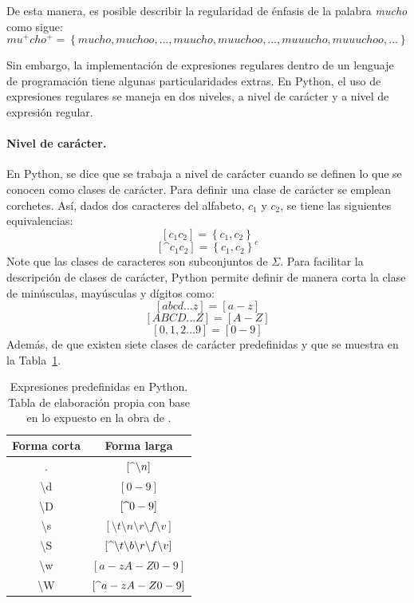 De esta manera, es posible describir la regularidad de énfasis de la palabra \textit{mucho} como sigue:
$$mu^+cho^+ = \left\lbrace mucho, muchoo, \ldots, muucho, muuchoo, \ldots, muuucho, muuuchoo, \ldots \right \rbrace$$

Sin embargo, la implementación de expresiones regulares dentro de un lenguaje de programación tiene algunas particularidades extras. En Python, el uso de expresiones regulares se maneja en dos niveles, a nivel de carácter y a nivel de expresión regular.

\paragraph{Nivel de carácter.} En Python, se dice que se trabaja a nivel de carácter cuando se definen lo que se conocen como clases de carácter. Para definir una clase de carácter se emplean corchetes. Así, dados dos caracteres del alfabeto, $c_1$ y $c_2$, se tiene las siguientes equivalencias:
$$[c_1c_2] = \left\lbrace c_1, c_2 \right\rbrace$$
$$[\mbox{\textasciicircum}c_1c_2] = \left\lbrace c_1, c_2 \right\rbrace^{c}$$
Note que las clases de caracteres son subconjuntos de $\Sigma$. Para facilitar la descripción de clases de carácter, Python permite definir de manera corta la clase de minúsculas, mayúsculas y dígitos como: $$[abcd\ldots z] = [a-z]$$ $$[ABCD\ldots Z] = [A-Z]$$ $$[0,1,2\ldots 9] = [0-9]$$ Además, de que existen siete clases de carácter predefinidas y que se muestra en la Tabla~\ref{tb:caracterclassre}.

	\begin{table}[h]
	\centering
	\caption{Expresiones predefinidas en Python. Tabla de elaboración propia con base en lo expuesto en la obra de \cite{lopez2014mastering}. }
	\label{tb:caracterclassre}
		\begin{tabular}{|c|c|}
			\hline
			\textbf{Forma corta} & \textbf{Forma larga}   \\ \hline
			.                    & $[\mbox{\mbox{\textasciicircum}}\mbox{\textbackslash{}}n]$         \\ \hline
			\textbackslash{}d    & $[0-9]$                \\ \hline
			\textbackslash{}D    & $[\mbox{\mbox{\textasciicircum}}0-9]$        \\ \hline
			\textbackslash{}s    & $[\mbox{\textbackslash{}}t\mbox{\textbackslash{}}n\mbox{\textbackslash{}}r\mbox{\textbackslash{}}f\mbox{\textbackslash{}}v]$         \\ \hline
			\textbackslash{}S    & $[\mbox{\mbox{\textasciicircum}}\mbox{\textbackslash{}}t\mbox{\textbackslash{}}b\mbox{\textbackslash{}}r\mbox{\textbackslash{}}f\mbox{\textbackslash{}}v]$ \\ \hline
			\textbackslash{}w    & $[a-zA-Z0-9]$          \\ \hline
			\textbackslash{}W    & $[\mbox{\mbox{\textasciicircum}}a-zA-Z0-9]$  \\ \hline
		\end{tabular}
	\end{table}

